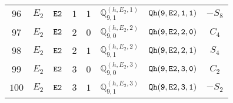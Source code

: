 \documentclass[fleqn,8pt]{jsarticle}
\begin{document}
\begin{table}[ht!]
\begin{center}
\begin{tabular}{cccccccc}
$ 96 $ & $ E_{2} $ & $ {\tt E2} $ & $ 1 $ & $ 1 $ & $ \mathbb{Q}_{9,1}^{(h,E_{2},1)} $ & $ {\tt Qh(9,E2,1,1)} $ & $ - S_{8} $ \\
$ 97 $ & $ E_{2} $ & $ {\tt E2} $ & $ 2 $ & $ 0 $ & $ \mathbb{Q}_{9,0}^{(h,E_{2},2)} $ & $ {\tt Qh(9,E2,2,0)} $ & $ C_{4} $ \\
$ 98 $ & $ E_{2} $ & $ {\tt E2} $ & $ 2 $ & $ 1 $ & $ \mathbb{Q}_{9,1}^{(h,E_{2},2)} $ & $ {\tt Qh(9,E2,2,1)} $ & $ S_{4} $ \\
$ 99 $ & $ E_{2} $ & $ {\tt E2} $ & $ 3 $ & $ 0 $ & $ \mathbb{Q}_{9,0}^{(h,E_{2},3)} $ & $ {\tt Qh(9,E2,3,0)} $ & $ C_{2} $ \\
$ 100 $ & $ E_{2} $ & $ {\tt E2} $ & $ 3 $ & $ 1 $ & $ \mathbb{Q}_{9,1}^{(h,E_{2},3)} $ & $ {\tt Qh(9,E2,3,1)} $ & $ - S_{2} $ \\
 \hline \hline
\end{tabular}
\end{center}
\end{table}
\end{document}
